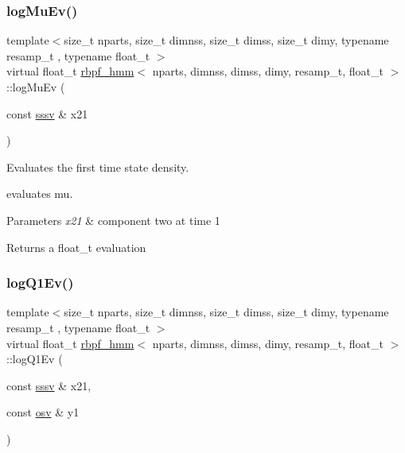 \subsubsection{\texorpdfstring{log\+Mu\+Ev()}{logMuEv()}}
{\footnotesize\ttfamily template$<$size\+\_\+t nparts, size\+\_\+t dimnss, size\+\_\+t dimss, size\+\_\+t dimy, typename resamp\+\_\+t , typename float\+\_\+t $>$ \\
virtual float\+\_\+t \hyperlink{classrbpf__hmm}{rbpf\+\_\+hmm}$<$ nparts, dimnss, dimss, dimy, resamp\+\_\+t, float\+\_\+t $>$\+::log\+Mu\+Ev (\begin{DoxyParamCaption}\item[{const \hyperlink{classrbpf__hmm_a28e8ad1d93bcf53cb74603f74826a81c}{sssv} \&}]{x21 }\end{DoxyParamCaption})\hspace{0.3cm}{\ttfamily [pure virtual]}}



Evaluates the first time state density. 

evaluates mu. 
\begin{DoxyParams}{Parameters}
{\em x21} & component two at time 1 \\
\hline
\end{DoxyParams}
\begin{DoxyReturn}{Returns}
a float\+\_\+t evaluation 
\end{DoxyReturn}
\mbox{\label{classrbpf__hmm_a7200983bf6acdbffaab91bec3e980a81}} 
\subsubsection{\texorpdfstring{log\+Q1\+Ev()}{logQ1Ev()}}
{\footnotesize\ttfamily template$<$size\+\_\+t nparts, size\+\_\+t dimnss, size\+\_\+t dimss, size\+\_\+t dimy, typename resamp\+\_\+t , typename float\+\_\+t $>$ \\
virtual float\+\_\+t \hyperlink{classrbpf__hmm}{rbpf\+\_\+hmm}$<$ nparts, dimnss, dimss, dimy, resamp\+\_\+t, float\+\_\+t $>$\+::log\+Q1\+Ev (\begin{DoxyParamCaption}\item[{const \hyperlink{classrbpf__hmm_a28e8ad1d93bcf53cb74603f74826a81c}{sssv} \&}]{x21,  }\item[{const \hyperlink{classrbpf__hmm_adafd37687fdd3bb776d3d33a5b0e7080}{osv} \&}]{y1 }\end{DoxyParamCaption})\hspace{0.3cm}{\ttfamily [pure virtual]}}



